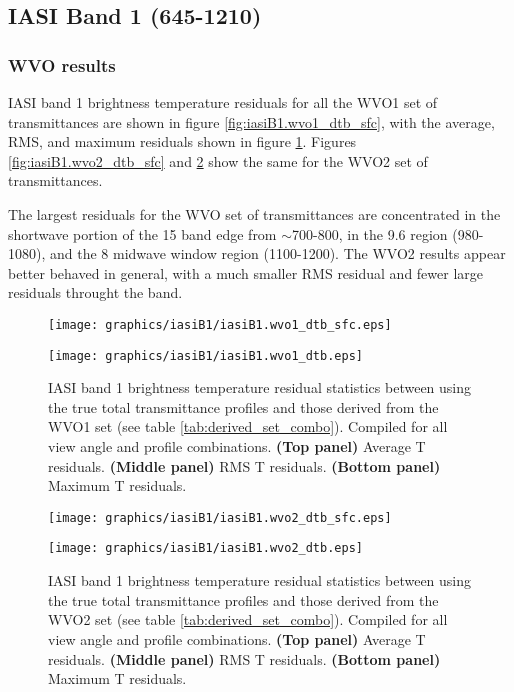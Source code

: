 \subsection{IASI Band 1 (645-1210\invcm)}

\subsubsection{WVO results}
IASI band 1 brightness temperature residuals for all the WVO1 set of transmittances are shown in figure \ref{fig:iasiB1.wvo1_dtb_sfc}, with the average, RMS, and maximum residuals shown in figure \ref{fig:iasiB1.wvo1_dtb}. Figures \ref{fig:iasiB1.wvo2_dtb_sfc} and \ref{fig:iasiB1.wvo2_dtb} show the same for the WVO2 set of transmittances.

The largest residuals for the WVO set of transmittances are concentrated in the shortwave portion of the \carbondioxide{} 15\micron{} band edge from $\sim$700-800\invcm, in the 9.6\micron{} \ozone{} region (980-1080\invcm), and the 8\micron{} midwave window region (1100-1200\invcm). The WVO2 results appear better behaved in general, with a much smaller RMS residual and fewer large residuals throught the band.
\begin{figure}[htp]
  \centering
  \texttt{[image: graphics/iasiB1/iasiB1.wvo1\_dtb\_sfc.eps]}
  \caption{IASI band 1 brightness temperature residuals for all view angles and profiles between using the true total transmittance profiles and those derived from the WVO1 set (see table \ref{tab:derived_set_combo})}
  \label{fig:iasiB1.wvo1_dtb_sfc}
  \vspace{1em}
  \texttt{[image: graphics/iasiB1/iasiB1.wvo1\_dtb.eps]}
  \caption{IASI band 1 brightness temperature residual statistics between using the true total transmittance profiles and those derived from the WVO1 set (see table \ref{tab:derived_set_combo}). Compiled for all view angle and profile combinations. \textbf{(Top panel)} Average T residuals. \textbf{(Middle panel)} RMS T residuals. \textbf{(Bottom panel)} Maximum T residuals.}
  \label{fig:iasiB1.wvo1_dtb}
\end{figure}
\begin{figure}[htp]
  \centering
  \texttt{[image: graphics/iasiB1/iasiB1.wvo2\_dtb\_sfc.eps]}
  \caption{IASI band 1 brightness temperature residuals for all view angles and profiles between using the true total transmittance profiles and those derived from the WVO2 set (see table \ref{tab:derived_set_combo})}
  \label{fig:iasiB1.wvo2_dtb_sfc}
  \vspace{1em}
  \texttt{[image: graphics/iasiB1/iasiB1.wvo2\_dtb.eps]}
  \caption{IASI band 1 brightness temperature residual statistics between using the true total transmittance profiles and those derived from the WVO2 set (see table \ref{tab:derived_set_combo}). Compiled for all view angle and profile combinations. \textbf{(Top panel)} Average T residuals. \textbf{(Middle panel)} RMS T residuals. \textbf{(Bottom panel)} Maximum T residuals.}
  \label{fig:iasiB1.wvo2_dtb}
\end{figure}


